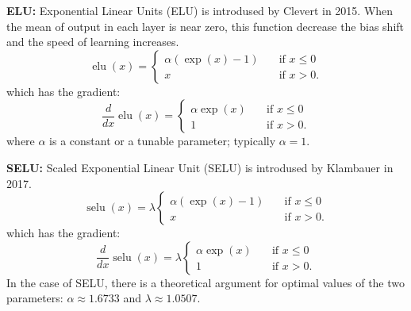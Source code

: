 \documentclass{article}
\DeclareMathOperator{\elu}{elu}
\DeclareMathOperator{\selu}{selu}
\begin{document}
{\bf ELU:}
Exponential Linear Units (ELU) is introdused by Clevert in 2015. When the mean of output in each layer is near zero, this function decrease the bias shift and the speed of learning increases.
\begin{equation}
  \elu(x) =
    \begin{cases}
      \alpha (\exp(x) - 1)      & \quad \text{if } x \leq  0 \\
      x       & \quad \text{if } x > 0 .
    \end{cases}
\end{equation}
which has the gradient:
\begin{equation}
  \frac{d}{dx} \elu(x) =
     \begin{cases}
      \alpha\exp(x)     & \quad \text{if } x \leq  0 \\
      1       & \quad \text{if } x > 0 .
    \end{cases}
\end{equation}
where $\alpha$ is a constant or a tunable parameter; typically $\alpha = 1$.


{\bf SELU:}
Scaled Exponential Linear Unit (SELU) is introdused by Klambauer in 2017.
\begin{equation}
  \selu(x) = \lambda
    \begin{cases}
      \alpha (\exp(x) - 1)      & \quad \text{if } x \leq  0 \\
      x       & \quad \text{if } x > 0 .
    \end{cases}
\end{equation}
which has the gradient:
\begin{equation}
  \frac{d}{dx} \selu(x) = \lambda
     \begin{cases}
      \alpha\exp(x)     & \quad \text{if } x \leq  0 \\
      1       & \quad \text{if } x > 0 .
    \end{cases}
\end{equation}
In the case of SELU, there is a theoretical argument for optimal values of the two parameters: $\alpha \approx 1.6733$ and $\lambda \approx 1.0507$.
\end{document}
